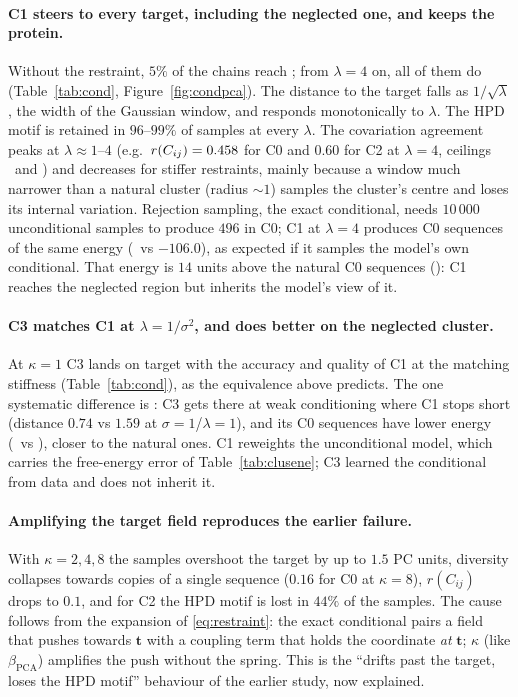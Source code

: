 \paragraph{C1 steers to every target, including the neglected one, and keeps the protein.} Without
the restraint, $5\%$ of the chains reach \MissCl; from $\lambda=4$ on, all of them do
(Table~\ref{tab:cond}, Figure~\ref{fig:condpca}). The distance to the target falls as
$1/\sqrt\lambda$, the width of the Gaussian window, and responds monotonically to $\lambda$. The HPD
motif is retained in $96$--$99\%$ of samples at every $\lambda$. The covariation agreement peaks at
$\lambda\approx1$--$4$ (e.g.\ $r(C_{ij})=0.458$ for C0 and $0.60$ for C2 at $\lambda=4$,
ceilings \CeilA\ and \CeilC) and decreases for stiffer restraints, mainly because a window much
narrower than a natural cluster (radius ${\sim}1$) samples the cluster's centre and loses its
internal variation. Rejection sampling, the exact conditional, needs $10\,000$ unconditional samples
to produce $496$ in C0; C1 at $\lambda=4$ produces C0 sequences of the same energy (\ConeALfourE\ vs
$-106.0$), as expected if it samples the model's own conditional. That energy is $14$ units above the
natural C0 sequences (\NatEA): C1 reaches the neglected region but inherits the model's view of it.

\paragraph{C3 matches C1 at $\lambda=1/\sigma^2$, and does better on the neglected cluster.} At
$\kappa=1$ C3 lands on target with the accuracy and quality of C1 at the matching stiffness
(Table~\ref{tab:cond}), as the equivalence above predicts. The one systematic difference is
\MissCl: C3 gets there at weak conditioning where C1 stops short (distance $0.74$ vs $1.59$ at
$\sigma=1$/$\lambda=1$), and its C0 sequences have lower energy (\CthreeAsHKoneE\ vs \ConeALfourE),
closer to the natural ones. C1 reweights the unconditional model, which carries the free-energy
error of Table~\ref{tab:clusene}; C3 learned the conditional from data and does not inherit it.

\paragraph{Amplifying the target field reproduces the earlier failure.} With $\kappa=2,4,8$ the samples
overshoot the target by up to $1.5$ PC units, diversity collapses towards copies of a single
sequence ($0.16$ for C0 at $\kappa=8$), $r(C_{ij})$ drops to $0.1$, and for C2 the HPD motif is lost in
$44\%$ of the samples. The cause follows from the expansion of \eqref{eq:restraint}: the exact
conditional pairs a field that pushes towards $\bm t$ with a coupling term that holds the coordinate
\emph{at} $\bm t$; $\kappa$ (like $\beta_\mathrm{PCA}$) amplifies the push without the spring. This is
the ``drifts past the target, loses the HPD motif'' behaviour of the earlier study, now explained.

